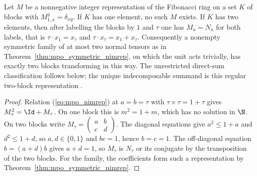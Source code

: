 \begin{corollary}%
    \label{thm:mpo_symmetry_fibonacci_rank_two}
    \leanok
    Let $M$ be a nonnegative integer representation of the Fibonacci ring on
    a set $K$ of blocks with $M_{1,x}^y=\delta_{xy}$. If $K$ has one element,
    no such $M$ exists. If $K$ has two elements, then after labelling the
    blocks by $1$ and $\tau$ one has $M_a=N_a$ for both labels, that is
    $\tau\cdot x_1=x_\tau$ and $\tau\cdot x_\tau=x_1+x_\tau$. Consequently a
    nonempty symmetric family of at most two normal tensors as in
    Theorem~\ref{thm:mpo_symmetric_nimrep}, on which the unit acts trivially,
    has exactly two blocks transforming in this way. The unrestricted
    direct-sum classification follows below; the unique indecomposable
    summand is this regular two-block representation
    \cite[Section~6]{GarreRubio2023MPOSym}.
\end{corollary}

\begin{proof}
    \leanok
    Relation (\ref{eq:mpo_nimrep}) at $a=b=\tau$ with
    $\tau\times\tau=1+\tau$ gives $M_\tau^2=\Id+M_\tau$. On one block this is
    $m^2=1+m$, which has no solution in $\N$. On two blocks write
    $M_\tau=\begin{pmatrix}a&b\\c&d\end{pmatrix}$. The diagonal equations give
    $a^2\leq1+a$ and $d^2\leq1+d$, so $a,d\in\{0,1\}$ and $bc=1$, hence
    $b=c=1$. The off-diagonal equation $b=(a+d)b$ gives $a+d=1$, so $M_\tau$
    is $N_\tau$ or its conjugate by the transposition of the two blocks. For
    the family, the coefficients form such a representation by
    Theorem~\ref{thm:mpo_symmetric_nimrep}.
\end{proof}



